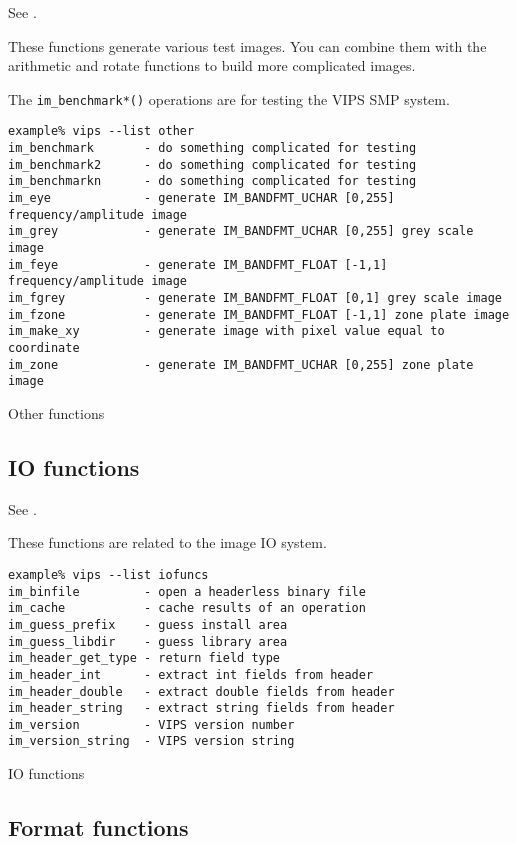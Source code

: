 See .

These functions generate various test images. You can combine them with
the arithmetic and rotate functions to build more complicated images.

The \verb+im_benchmark*()+ operations are for testing the VIPS SMP system.

\begin{fig2}
\begin{verbatim}
example% vips --list other
im_benchmark       - do something complicated for testing
im_benchmark2      - do something complicated for testing
im_benchmarkn      - do something complicated for testing
im_eye             - generate IM_BANDFMT_UCHAR [0,255] frequency/amplitude image
im_grey            - generate IM_BANDFMT_UCHAR [0,255] grey scale image
im_feye            - generate IM_BANDFMT_FLOAT [-1,1] frequency/amplitude image
im_fgrey           - generate IM_BANDFMT_FLOAT [0,1] grey scale image
im_fzone           - generate IM_BANDFMT_FLOAT [-1,1] zone plate image
im_make_xy         - generate image with pixel value equal to coordinate
im_zone            - generate IM_BANDFMT_UCHAR [0,255] zone plate image
\end{verbatim}
\caption{Other functions}
\label{fg:other}
\end{fig2}

\subsection{IO functions}

See .

These functions are related to the image IO system. 

\begin{fig2}
\begin{verbatim}
example% vips --list iofuncs
im_binfile         - open a headerless binary file
im_cache           - cache results of an operation
im_guess_prefix    - guess install area
im_guess_libdir    - guess library area
im_header_get_type - return field type
im_header_int      - extract int fields from header
im_header_double   - extract double fields from header
im_header_string   - extract string fields from header
im_version         - VIPS version number
im_version_string  - VIPS version string
\end{verbatim}
\caption{IO functions}
\label{fg:io}
\end{fig2}

\subsection{Format functions}

